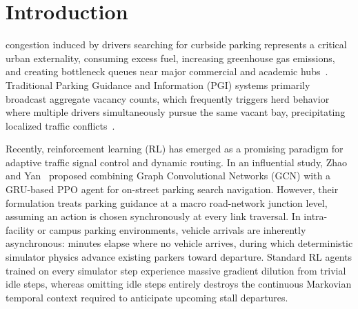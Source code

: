 \documentclass[journal]{IEEEtran}
\begin{document}
\section{Introduction}
 congestion induced by drivers searching for curbside parking represents a critical urban externality, consuming excess fuel, increasing greenhouse gas emissions, and creating bottleneck queues near major commercial and academic hubs~\cite{shoup2006cruising}. Traditional Parking Guidance and Information (PGI) systems primarily broadcast aggregate vacancy counts, which frequently triggers herd behavior where multiple drivers simultaneously pursue the same vacant bay, precipitating localized traffic conflicts~\cite{lin2017survey}.

Recently, reinforcement learning (RL) has emerged as a promising paradigm for adaptive traffic signal control and dynamic routing. In an influential study, Zhao and Yan~\cite{zhao2025deep} proposed combining Graph Convolutional Networks (GCN) with a GRU-based PPO agent for on-street parking search navigation. However, their formulation treats parking guidance at a macro road-network junction level, assuming an action is chosen synchronously at every link traversal. In intra-facility or campus parking environments, vehicle arrivals are inherently asynchronous: minutes elapse where no vehicle arrives, during which deterministic simulator physics advance existing parkers toward departure. Standard RL agents trained on every simulator step experience massive gradient dilution from trivial idle steps, whereas omitting idle steps entirely destroys the continuous Markovian temporal context required to anticipate upcoming stall departures.
\end{document}
